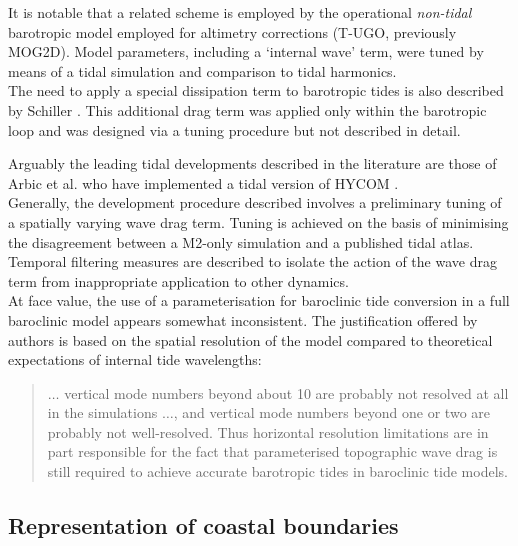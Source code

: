 It is notable that a related scheme is employed by the operational \emph{non-tidal} barotropic model employed for altimetry corrections (T-UGO, previously MOG2D)\citep{Carrere:2003cj}.  Model parameters, including a `internal wave' term, were tuned by means of a tidal simulation and comparison to tidal harmonics. \\


The need to apply a special dissipation term to barotropic tides is also described by Schiller \citep[Eq 6]{Schiller:2007gk}.   This additional drag term was applied only within the barotropic loop and was designed via a tuning procedure but not described in detail.



Arguably the leading tidal \OGCM{} developments described in the literature are those of Arbic et al. who have implemented a tidal version of HYCOM \cite{Arbic:2005gv,Arbic:2009hf,Arbic:2010us,Arbic:hy}.\\
Generally, the development procedure described involves a preliminary tuning of a spatially varying wave drag term.  Tuning is achieved on the basis of minimising the disagreement between a M2-only simulation and a published tidal atlas.   
Temporal filtering measures are described to isolate the action of the wave drag term from inappropriate application to other dynamics.  \\
At face value, the use of a parameterisation for baroclinic tide conversion in a full baroclinic model appears somewhat inconsistent.   The justification offered by authors is based on the spatial resolution of the model compared to theoretical expectations of internal tide wavelengths:
\noindent \begin{quotation}
$\dots{}$  vertical mode numbers beyond about 10 are probably not resolved at all in the simulations $\dots{}$, and vertical mode numbers beyond one or two are probably not well-resolved. Thus horizontal resolution limitations are in part responsible for the fact that parameterised topographic wave drag is still required to achieve accurate barotropic tides in baroclinic tide models. \citep[pp177]{Arbic:2010us}
\end{quotation}



\subsection{Representation of coastal boundaries}

